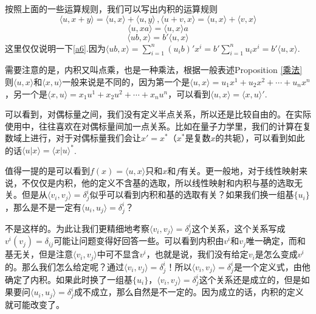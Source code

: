 \documentclass[11pt,a4paper,openany]{book}%
\theoremstyle{plain}%
\begin{document}
按照上面的一些运算规则，我们可以写出内积的运算规则
\[
\langle u,x+y \rangle=\langle u,x \rangle +\langle u,y \rangle \,,\langle u+v,x \rangle=\langle u,x \rangle+\langle v,x \rangle
\]
\begin{equation}
\label{a5}
\langle u,xa \rangle=\langle u,x \rangle a
\end{equation}
\begin{equation}
\label{a6}
\langle ub,x \rangle=b'\langle u,x \rangle
\end{equation}
这里仅仅说明一下\eqref{a6}.因为$\langle ub,x \rangle=\sum_{i=1}^n (u_ib)'x^i=b'\sum_{i=1}^n u_ix^i=b'\langle u,x \rangle$.

需要注意的是，内积又叫点乘，也是一种乘法，根据一般表述Proposition \ref{乘法} 则$\langle u,x \rangle$和$\langle x,u \rangle$一般来说是不同的，因为第一个是$\langle u,x \rangle=u_1x^1+u_2x^2+\cdots+u_nx^n$，另一个是$\langle x,u \rangle=x_1u^1+x_2u^2+\cdots+x_nu^n$，可以看到$\langle u,x \rangle=\langle x,u \rangle'$.

可以看到，对偶标量之间，我们没有定义半点关系，所以还是比较自由的。在实际使用中，往往喜欢在对偶标量间加一点关系。比如在量子力学里，我们的计算在复数域上进行，对于对偶标量我们会让$x'=x^*$（$x^*$是复数$x$的共轭），可以看到如此的话$\langle u|x \rangle=\langle x|u \rangle^*$.

值得一提的是可以看到$f(x)=\langle u,x \rangle$只和$x$和$f$有关。更一般地，对于线性映射来说，不仅仅是内积，他的定义不含基的选取，所以线性映射和内积与基的选取无关。但是从$\langle v_i,v_j\rangle=\delta_{j}^i$似乎可以看到内积和基的选取有关？如果我们换一组基$\{u_i\}$，那么是不是一定有$\langle u_i,u_j\rangle=\delta_{j}^i$？

不是这样的。为此让我们更精细地考察$\langle v_i,v_j\rangle=\delta_{j}^i$这个关系，这个关系写成$v^i(v_j)=\delta_{ij}$可能让问题变得好回答一些。可以看到内积由$v^i$和$v_j$唯一确定，而和基无关，但是注意$\langle v_i,v_j\rangle$中可不显含$v^i$，也就是说，我们没有给定$v_i$是怎么变成$v^i$的。那么我们怎么给定呢？通过$\langle v_i,v_j\rangle=\delta_{j}^i$！所以$\langle v_i,v_j\rangle=\delta_{j}^i$是一个定义式，由他确定了内积。如果此时换了一组基$\{u_i\}$，$\langle v_i,v_j\rangle=\delta_{j}^i$这个关系还是成立的，但是如果要问$\langle u_i,u_j\rangle=\delta_{j}^i$成不成立，那么自然是不一定的。因为成立的话，内积的定义就可能改变了。
\end{document}
